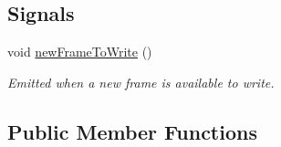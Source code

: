 \subsection*{Signals}
\begin{DoxyCompactItemize}
\item 
void \hyperlink{classmdt_tcp_socket_ad8646d441b33bdfb8ddc902ebb136999}{newFrameToWrite} ()
\begin{DoxyCompactList}\small\item\em Emitted when a new frame is available to write. \end{DoxyCompactList}\end{DoxyCompactItemize}
\subsection*{Public Member Functions}
